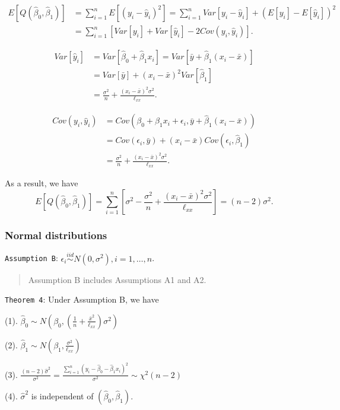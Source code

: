 \documentclass[]{article}
\begin{document}
\[
\begin{align}
E[Q(\hat \beta_0,\hat\beta_1)] &= \sum_{i=1}^nE[(y_i-\hat y_i)^2]=\sum_{i=1}^nVar[y_i-\hat y_i]+(E[y_i]-E[\hat y_i])^2\\
&=\sum_{i=1}^n[Var[y_i]+Var[\hat y_i]-2Cov(y_i,\hat y_i)].
\end{align}
\]

\[
\begin{align}
Var[\hat y_i]&= Var[\hat\beta_0+\hat\beta_1x_i]=Var[\bar y+\hat\beta_1(x_i-\bar x)]\\
&=Var[\bar y]+(x_i-\bar x)^2Var[\hat\beta_1]\\
&=\frac{\sigma^2}{n}+\frac{(x_i-\bar x)^2\sigma^2}{\ell_{xx}}.
\end{align}\]

\[
\begin{align}
Cov(y_i,\hat y_i)  &= Cov(\beta_0+\beta_1x_i+\epsilon_i, \bar y+\hat\beta_1(x_i-\bar x))\\
&=Cov(\epsilon_i,\bar y)+(x_i-\bar x)Cov(\epsilon_i,\hat\beta_1)\\
&=\frac{\sigma^2}{n}+\frac{(x_i-\bar x)^2\sigma^2}{\ell_{xx}}.
\end{align}
\]

As a result, we have
\[E[Q(\hat \beta_0,\hat\beta_1)] = \sum_{i=1}^n \left[\sigma^2-\frac{\sigma^2}{n}+\frac{(x_i-\bar x)^2\sigma^2}{\ell_{xx}}\right]=(n-2)\sigma^2.\]

\hypertarget{normal-distributions}{%
\subsubsection{Normal distributions}\label{normal-distributions}}

\texttt{Assumption\ B}:
\(\epsilon_i\stackrel{iid}{\sim}N(0,\sigma^2),i=1,\dots,n\).

\begin{quote}
Assumption B includes Assumptions A1 and A2.
\end{quote}

\texttt{Theorem\ 4}: Under Assumption B, we have

(1).
\(\hat\beta_0\sim N(\beta_0,(\frac 1n+\frac{\bar x^2}{\ell_{xx}})\sigma^2)\)

(2). \(\hat\beta_1\sim N(\beta_1,\frac{\sigma^2}{\ell_{xx}})\)

(3).
\(\frac{(n-2)\hat\sigma^2}{\sigma^2}=\frac{\sum_{i=1}^n(y_i-\hat\beta_0-\hat\beta_1x_i)^2}{\sigma^2}\sim \chi^2(n-2)\)

(4). \(\hat\sigma^2\) is independent of \((\hat\beta_0,\hat\beta_1)\).
\end{document}
